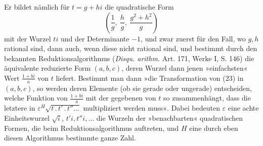 Er bildet nämlich für \(t=g+hi\) die quadratische Form
\begingroup\makeatletter\tagsleft@true\let\veqno\leqno\makeatother
\begin{equation*}
\left(\frac1g,\ \frac hg,\ \frac{g^2+h^2}g\right)\tag{23}
\end{equation*}
\endgroup
\clearpage{}
\HistoricalFoot{}{13\textsuperscript{*}}
\noindent mit der Wurzel \(ti\) und der Determinante \(-1\), und zwar zuerst für den Fall,
wo \(g,h\) rational sind, dann auch, wenn diese nicht rational sind, und bestimmt
durch den bekannten Reduktionsalgorithmus (\textit{Disqu. arithm.} Art. 171,
Werke I, S. 146) die äquivalente reduzierte Form \((a,b,c)\), deren Wurzel
dann jenen »einfachsten« Wert \(\frac{1+bi}a\) von \(t\) liefert. Bestimmt man dann »die
Transformation von (23) in \((a,b,c)\), so werden deren Elemente (ob sie gerade
oder ungerade) entscheiden, welche Funktion von \(\frac{1+bi}a\) mit der gegebenen
von \(t\) so zusammenhängt, dass die letztere in \(\varepsilon^H\sqrt{t\mathpunct{.}t'\mathpunct{.}t''\ldots}\) multipliziert werden
muss«. Dabei bedeuten \(\varepsilon\) eine achte Einheitswurzel \(\sqrt i\), \(t'i,t''i,\ldots\) die Wurzeln
der »benachbarten« quadratischen Formen, die beim Reduktionsalgorithmus auftreten,
und \(H\) eine durch eben diesen Algorithmus bestimmte ganze Zahl.

